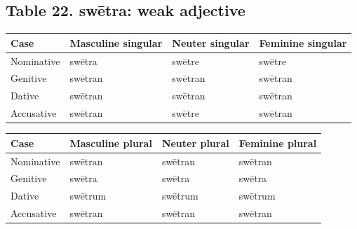 \subsection*{Table 22. swētra: weak adjective}

\par\begingroup
\fontsize{10.5}{13.2}\selectfont
\setlength{\LTleft}{0pt}\setlength{\LTright}{\fill}
\noindent
\begin{tabular}{@{}>{\raggedright\arraybackslash}p{22.0mm}>{\raggedright\arraybackslash}p{31.188mm}>{\raggedright\arraybackslash}p{31.188mm}>{\raggedright\arraybackslash}p{31.188mm}@{}}
\toprule
\textbf{Case} & \textbf{Masculine singular} & \textbf{Neuter singular} & \textbf{Feminine singular} \\
\midrule
Nominative & swētra & swētre & swētre \\
Genitive & swētran & swētran & swētran \\
Dative & swētran & swētran & swētran \\
Accusative & swētran & swētre & swētran \\
\bottomrule
\end{tabular}
\par\endgroup
\par\addvspace{5pt}
\par\begingroup
\fontsize{10.5}{13.2}\selectfont
\setlength{\LTleft}{0pt}\setlength{\LTright}{\fill}
\noindent
\begin{tabular}{@{}>{\raggedright\arraybackslash}p{22.0mm}>{\raggedright\arraybackslash}p{31.188mm}>{\raggedright\arraybackslash}p{31.188mm}>{\raggedright\arraybackslash}p{31.188mm}@{}}
\toprule
\textbf{Case} & \textbf{Masculine plural} & \textbf{Neuter plural} & \textbf{Feminine plural} \\
\midrule
Nominative & swētran & swētran & swētran \\
Genitive & swētra & swētra & swētra \\
Dative & swētrum & swētrum & swētrum \\
Accusative & swētran & swētran & swētran \\
\bottomrule
\end{tabular}
\par\endgroup

